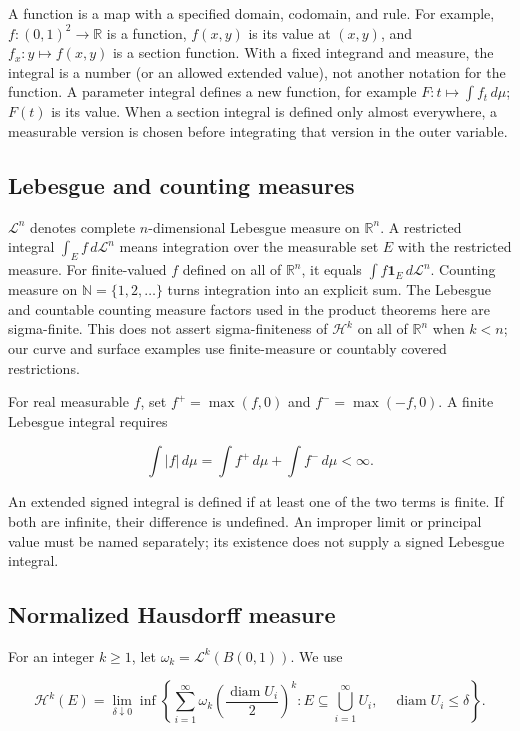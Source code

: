 \documentclass[
  11pt,
]{article}
\begin{document}
A function is a map with a specified domain, codomain, and rule. For
example, \(f:(0,1)^2\to\mathbb R\) is a function, \(f(x,y)\) is its
value at \((x,y)\), and \(f_x:y\mapsto f(x,y)\) is a section function.
With a fixed integrand and measure, the integral is a number (or an
allowed extended value), not another notation for the function. A
parameter integral defines a new function, for example
\(F:t\mapsto\int f_t\,d\mu\); \(F(t)\) is its value. When a section
integral is defined only almost everywhere, a measurable version is
chosen before integrating that version in the outer variable.

\subsection{Lebesgue and counting
measures}\label{lebesgue-and-counting-measures}

\(\mathcal L^n\) denotes complete \(n\)-dimensional Lebesgue measure on
\(\mathbb R^n\). A restricted integral \(\int_E f\,d\mathcal L^n\) means
integration over the measurable set \(E\) with the restricted measure.
For finite-valued \(f\) defined on all of \(\mathbb R^n\), it equals
\(\int f\mathbf1_E\,d\mathcal L^n\). Counting measure on
\(\mathbb N=\{1,2,\ldots\}\) turns integration into an explicit sum. The
Lebesgue and countable counting measure factors used in the product
theorems here are sigma-finite. This does not assert sigma-finiteness of
\(\mathcal H^k\) on all of \(\mathbb R^n\) when \(k<n\); our curve and
surface examples use finite-measure or countably covered restrictions.

For real measurable \(f\), set \(f^+=\max(f,0)\) and \(f^-=\max(-f,0)\).
A finite Lebesgue integral requires

\[
\int |f|\,d\mu=\int f^+\,d\mu+\int f^-\,d\mu<\infty.
\]

An extended signed integral is defined if at least one of the two terms
is finite. If both are infinite, their difference is undefined. An
improper limit or principal value must be named separately; its
existence does not supply a signed Lebesgue integral.

\subsection{Normalized Hausdorff
measure}\label{normalized-hausdorff-measure}

For an integer \(k\geq1\), let \(\omega_k=\mathcal L^k(B(0,1))\). We use

\[
\mathcal H^k(E)=\lim_{\delta\downarrow0}\inf\left\{
\sum_{i=1}^{\infty}\omega_k\left(\frac{\operatorname{diam}U_i}{2}\right)^k:
E\subseteq\bigcup_{i=1}^{\infty}U_i,\quad
\operatorname{diam}U_i\leq\delta\right\}.
\]
\end{document}
